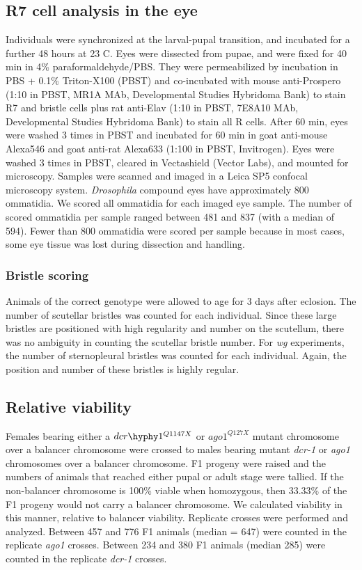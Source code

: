 \subsection{R7 cell analysis in the eye}

Individuals were synchronized at the larval-pupal transition, and incubated for a further 48 hours at 23 \textdegree{}C. Eyes were dissected from pupae, and were fixed for 40 min in 4\% paraformaldehyde/PBS. They were permeabilized by incubation in PBS + 0.1\% Triton-X100 (PBST) and co-incubated with mouse anti-Prospero (1:10 in PBST, MR1A MAb, Developmental Studies Hybridoma Bank) to stain R7 and bristle cells plus rat anti-Elav (1:10 in PBST, 7E8A10 MAb, Developmental Studies Hybridoma Bank) to stain all R cells. After 60 min, eyes were washed 3 times in PBST and incubated for 60 min in goat anti-mouse Alexa546 and goat anti-rat Alexa633 (1:100 in PBST, Invitrogen). Eyes were washed 3 times in PBST, cleared in Vectashield (Vector Labs), and mounted for microscopy. Samples were scanned and imaged in a Leica SP5 confocal microscopy system. \textit{Drosophila} compound eyes have approximately 800 ommatidia. We scored all ommatidia for each imaged eye sample. The number of scored ommatidia per sample ranged between 481 and 837 (with a median of 594). Fewer than 800 ommatidia were scored per sample because in most cases, some eye tissue was lost during dissection and handling.

\subsubsection{Bristle scoring}

Animals of the correct genotype were allowed to age for 3 days after eclosion. The number of scutellar bristles was counted for each individual. Since these large bristles are positioned with high regularity and number on the scutellum, there was no ambiguity in counting the scutellar bristle number. For \textit{wg} experiments, the number of sternopleural bristles was counted for each individual. Again, the position and number of these bristles is highly regular.

\subsection{Relative viability}

Females bearing either a $dcr\hyphy 1^{Q1147X}$ or $ago1^{Q127X}$ mutant chromosome over a balancer chromosome were crossed to males bearing mutant \textit{dcr-1} or \textit{ago1} chromosomes over a balancer chromosome. F1 progeny were raised and the numbers of animals that reached either pupal or adult stage were tallied. If the non-balancer chromosome is 100\% viable when homozygous, then 33.33\% of the F1 progeny would not carry a balancer chromosome. We calculated viability in this manner, relative to balancer viability. Replicate crosses were performed and analyzed. Between 457 and 776 F1 animals (median = 647) were counted in the replicate \textit{ago1} crosses. Between 234 and 380 F1 animals (median 285) were counted in the replicate \textit{dcr-1} crosses.

